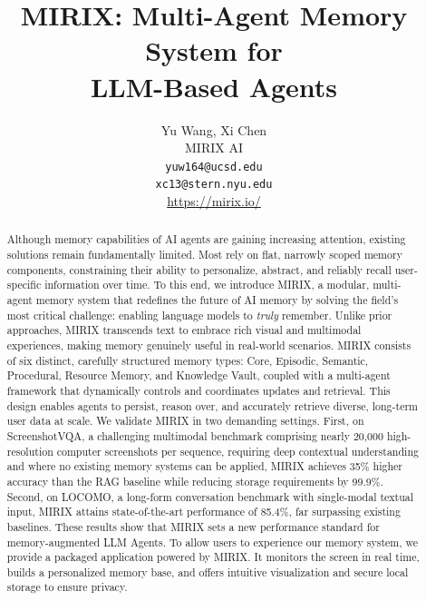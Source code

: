 \documentclass{article}
\title{MIRIX: Multi-Agent Memory System for\\LLM-Based Agents}
\author{%
  Yu Wang, Xi Chen \\
  MIRIX AI \\
  \texttt{yuw164@ucsd.edu}\\
  \texttt{xc13@stern.nyu.edu} \\
\url{https://mirix.io/}
}
\newcommand{\ours}{MIRIX\xspace}
\begin{document}
\maketitle

\begin{abstract}
Although memory capabilities of AI agents are gaining increasing attention, existing solutions remain fundamentally limited. Most rely on flat, narrowly scoped memory components, constraining their ability to personalize, abstract, and reliably recall user-specific information over time. To this end, we introduce MIRIX, a modular, multi-agent memory system that redefines the future of AI memory by solving the field’s most critical challenge: enabling language models to \emph{truly} remember. Unlike prior approaches, MIRIX transcends text to embrace rich visual and multimodal experiences, making memory genuinely useful in real-world scenarios. MIRIX consists of six distinct, carefully structured memory types: Core, Episodic, Semantic, Procedural, Resource Memory, and Knowledge Vault, coupled with a multi-agent framework that dynamically controls and coordinates updates and retrieval. This design enables agents to persist, reason over, and accurately retrieve diverse, long-term user data at scale.
We validate MIRIX in two demanding settings. First, on ScreenshotVQA, a challenging multimodal benchmark comprising nearly 20,000 high-resolution computer screenshots per sequence, requiring deep contextual understanding and where no existing memory systems can be applied, MIRIX achieves 35\% higher accuracy than the RAG baseline while reducing storage requirements by 99.9\%. Second, on LOCOMO, a long-form conversation benchmark with single-modal textual input, MIRIX attains state-of-the-art performance of 85.4\%, far surpassing existing baselines. These results show that MIRIX sets a new performance standard for memory-augmented LLM Agents. To allow users to experience our memory system, we provide a packaged application powered by \ours. It monitors the screen in real time, builds a personalized memory base, and offers intuitive visualization and secure local storage to ensure privacy.
\end{abstract}








\clearpage



\clearpage

\appendix

\end{document}
